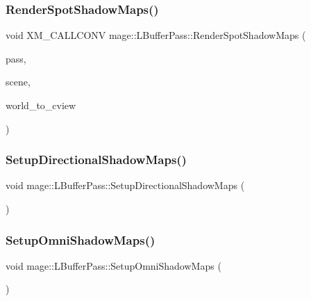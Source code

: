 \subsubsection{\texorpdfstring{Render\+Spot\+Shadow\+Maps()}{RenderSpotShadowMaps()}}
{\footnotesize\ttfamily void X\+M\+\_\+\+C\+A\+L\+L\+C\+O\+NV mage\+::\+L\+Buffer\+Pass\+::\+Render\+Spot\+Shadow\+Maps (\begin{DoxyParamCaption}\item[{\hyperlink{classmage_1_1_depth_pass}{Depth\+Pass} $\ast$}]{pass,  }\item[{const \hyperlink{classmage_1_1_scene}{Scene} \&}]{scene,  }\item[{F\+X\+M\+M\+A\+T\+R\+IX}]{world\+\_\+to\+\_\+cview }\end{DoxyParamCaption})\hspace{0.3cm}{\ttfamily [private]}}

\hypertarget{structmage_1_1_l_buffer_pass_aa6a3dd241588a460e2ea51f6cec14aeb}{}\label{structmage_1_1_l_buffer_pass_aa6a3dd241588a460e2ea51f6cec14aeb} 
\subsubsection{\texorpdfstring{Setup\+Directional\+Shadow\+Maps()}{SetupDirectionalShadowMaps()}}
{\footnotesize\ttfamily void mage\+::\+L\+Buffer\+Pass\+::\+Setup\+Directional\+Shadow\+Maps (\begin{DoxyParamCaption}{ }\end{DoxyParamCaption})\hspace{0.3cm}{\ttfamily [private]}}

\hypertarget{structmage_1_1_l_buffer_pass_a530276d14da57710e5182abda48982d4}{}\label{structmage_1_1_l_buffer_pass_a530276d14da57710e5182abda48982d4} 
\subsubsection{\texorpdfstring{Setup\+Omni\+Shadow\+Maps()}{SetupOmniShadowMaps()}}
{\footnotesize\ttfamily void mage\+::\+L\+Buffer\+Pass\+::\+Setup\+Omni\+Shadow\+Maps (\begin{DoxyParamCaption}{ }\end{DoxyParamCaption})\hspace{0.3cm}{\ttfamily [private]}}

